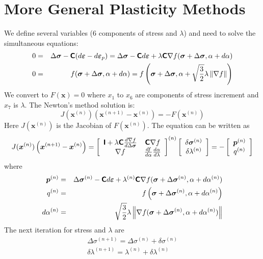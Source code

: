 \documentclass[11pt]{book}
\renewcommand{\vec}[1]{\boldsymbol{#1}}
\newcommand{\tens}[1]{\boldsymbol{\mathsf{#1}}}
\begin{document}
\newcommand{\norm}[1]{\left\lVert#1\right\rVert}

\section{More General Plasticity Methods}

We define several variables (6 components of stress and $\lambda$) and need to solve the simultaneous equations:
\begin{eqnarray}
       0 & = & \Delta \tens\sigma - \tens C( d\tens\varepsilon - d\tens\varepsilon_p) = \Delta \tens\sigma - \tens C d\tens\varepsilon + \lambda \tens C \nabla f(\tens\sigma + \Delta \tens\sigma,\alpha +d\alpha)\\
       0 & = & f(\tens\sigma + \Delta \tens\sigma,\alpha +d\alpha) = f\left(\tens\sigma + \Delta \tens\sigma,\alpha +\sqrt{3\over2}\lambda \norm{\nabla f}\right)
\end{eqnarray}
We convert to $F(\vec x)=0$ where $x_1$ to $x_6$ are components of stress increment and $x_7$ is $\lambda$. The Newton's method solution is:
\begin{equation}
    J(\vec x^{(n)}) \left(\vec x^{(n+1)}-\vec x^{(n)}\right) = -F(\vec x^{(n)})
\end{equation}
Here $J(\vec x^{(n)})$ is the Jacobian of $F(\vec x^{(n)})$. The equation can be written as
\begin{equation}
    J(\vec x^{(n)})\left(\vec x^{(n+1)}-\vec x^{(n)}\right) = \left[ \begin{array}{cc}   \tens I + \lambda\tens C{d\nabla f \over d\Delta\tens\sigma} & \tens C\nabla f \\
                     \nabla f & {df\over d\alpha} {d\alpha\over d\lambda} \end{array} \right]^{(n)} 
                     \left[\begin{array}{c} \delta\tens\sigma^{(n)} \\ \delta\lambda^{(n)} \end{array}\right]
                     = -\left[\begin{array}{c} \vec p^{(n)} \\ q^{(n)} \end{array}\right]
\end{equation}
where
\begin{eqnarray}
       \vec p^{(n)} & = &  \Delta \tens\sigma^{(n)} - \tens C d\tens\varepsilon + \lambda^{(n)} \tens C \nabla f(\tens\sigma + \Delta \tens\sigma^{(n)},\alpha +d\alpha^{(n)})\\
       q^{(n)} & = &  f\left(\tens\sigma + \Delta \tens\sigma^{(n)},\alpha +d\alpha^{(n)}\right) \\
       d\alpha^{(n)} & = & \sqrt{3\over2}\lambda \norm{\nabla f(\tens\sigma + \Delta \tens\sigma^{(n)},\alpha +d\alpha^{(n)})}
\end{eqnarray}
The next iteration for stress and $\lambda$ are
\begin{eqnarray}
       \Delta\tens\sigma^{(n+1)} = \Delta\tens\sigma^{(n)} + \delta\tens\sigma^{(n)} \\
       \delta\lambda^{(n+1)}  = \lambda^{(n)}  + \delta\lambda^{(n)}  
\end{eqnarray}
\end{document}
